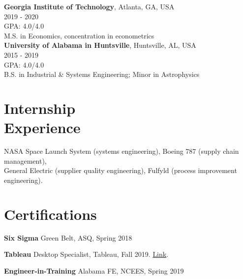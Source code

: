 \documentclass[margin,line]{res}
\begin{document}
\begin{resume}
{\bf Georgia Institute of Technology}, Atlanta, GA, USA\\
2019 - 2020\\
GPA: 4.0/4.0\\
M.S. in Economics, concentration in econometrics\\

\vspace{-.35cm}
{\bf University of Alabama in Huntsville}, Huntsville, AL, USA\\
2015 - 2019\\
GPA: 4.0/4.0\\
B.S. in Industrial \& Systems Engineering; Minor in Astrophysics\\


\vspace{-.35cm}
\section{\sc Internship \\ Experience}
NASA Space Launch System (systems engineering), Boeing 787 (supply chain management), \\ General Electric (supplier quality engineering), Fulfyld (process improvement engineering). 



\vspace{.25cm}



\vspace{.15cm}

\section{\sc Certifications}
{\bf Six Sigma} Green Belt, ASQ, Spring 2018
\vspace*{-3mm}

{\bf Tableau} Desktop Specialist, Tableau, Fall 2019. \href{https://www.credly.com/badges/e9a605a8-1977-4a1c-ab24-149a37c7fb36/linked_in_profile}{Link}.
\vspace*{-3mm}

{\bf Engineer-in-Training} Alabama FE, NCEES, Spring 2019
\vspace*{-3mm}


\end{resume}
\end{document}
